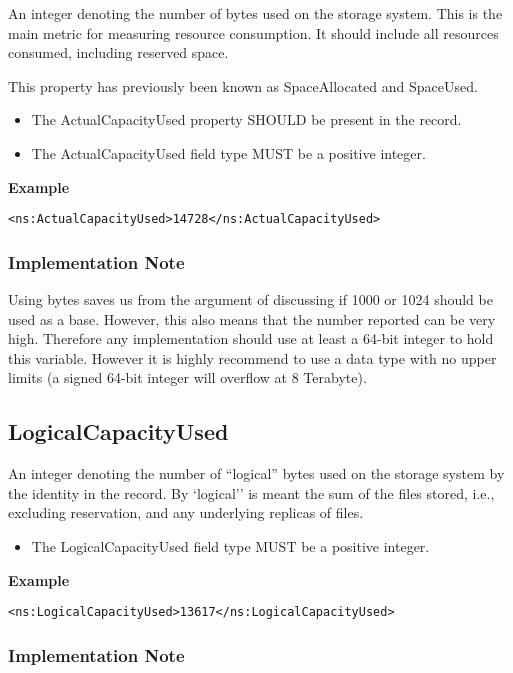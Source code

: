An integer denoting the number of bytes used on the storage system. This is the
main metric for measuring resource consumption. It should include all resources
consumed, including reserved space.

This property has previously been known as SpaceAllocated and SpaceUsed.

\begin{itemize}
\item The ActualCapacityUsed property SHOULD be present in the record.
\item The ActualCapacityUsed field type MUST be a positive integer.
\end{itemize}

{\bf Example}
\begin{verbatim}
<ns:ActualCapacityUsed>14728</ns:ActualCapacityUsed>
\end{verbatim}

\subsubsection*{Implementation Note}

Using bytes saves us from the argument of discussing if 1000 or 1024 should be
used as a base. However, this also means that the number reported can be very
high. Therefore any implementation should use at least a 64-bit integer to hold
this variable. However it is highly recommend to use a data type with no upper
limits (a signed 64-bit integer will overflow at 8 Terabyte).


\subsection{LogicalCapacityUsed}

An integer denoting the number of ``logical'' bytes used on the storage system
by the identity in the record. By `logical'' is meant the sum of the files
stored, i.e., excluding reservation, and any underlying replicas of files.

\begin{itemize}
\item The LogicalCapacityUsed field type MUST be a positive integer.
\end{itemize}

{\bf Example}
\begin{verbatim}
<ns:LogicalCapacityUsed>13617</ns:LogicalCapacityUsed>
\end{verbatim}

\subsubsection*{Implementation Note}

